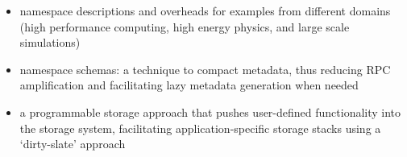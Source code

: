 \begin{itemize}
  \setlength\itemsep{-0.5em}

  \item namespace descriptions and overheads for examples from different
domains (high performance computing, high energy physics, and large scale
simulations)

  \item namespace schemas: a technique to compact metadata, thus reducing RPC
amplification and facilitating lazy metadata generation when needed

  \item a programmable storage approach that pushes user-defined functionality
into the storage system, facilitating application-specific storage stacks using
a `dirty-slate' approach

\end{itemize}
